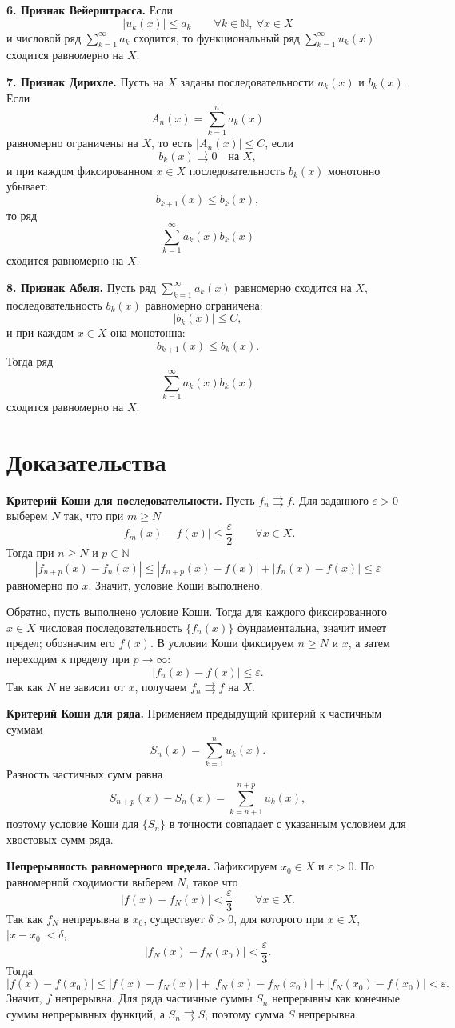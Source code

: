 \documentclass[12pt,a4paper]{article}
\newcommand{\eps}{\varepsilon}
\begin{document}
\textbf{6. Признак Вейерштрасса.}
Если
\[
  |u_k(x)|\le a_k\qquad \forall k\in\mathbb N,\ \forall x\in X
\]
и числовой ряд \(\sum_{k=1}^{\infty}a_k\) сходится, то функциональный ряд
\(\sum_{k=1}^{\infty}u_k(x)\) сходится равномерно на \(X\).

\textbf{7. Признак Дирихле.}
Пусть на \(X\) заданы последовательности \(a_k(x)\) и \(b_k(x)\). Если
\[
  A_n(x)=\sum_{k=1}^n a_k(x)
\]
равномерно ограничены на \(X\), то есть \(|A_n(x)|\le C\), если
\[
  b_k(x)\rightrightarrows 0\quad \text{на }X,
\]
и при каждом фиксированном \(x\in X\) последовательность \(b_k(x)\)
монотонно убывает:
\[
  b_{k+1}(x)\le b_k(x),
\]
то ряд
\[
  \sum_{k=1}^{\infty}a_k(x)b_k(x)
\]
сходится равномерно на \(X\).

\textbf{8. Признак Абеля.}
Пусть ряд \(\sum_{k=1}^{\infty}a_k(x)\) равномерно сходится на \(X\),
последовательность \(b_k(x)\) равномерно ограничена:
\[
  |b_k(x)|\le C,
\]
и при каждом \(x\in X\) она монотонна:
\[
  b_{k+1}(x)\le b_k(x).
\]
Тогда ряд
\[
  \sum_{k=1}^{\infty}a_k(x)b_k(x)
\]
сходится равномерно на \(X\).

\section*{Доказательства}

\textbf{Критерий Коши для последовательности.}
Пусть \(f_n\rightrightarrows f\). Для заданного \(\eps>0\) выберем \(N\) так,
что при \(m\ge N\)
\[
  |f_m(x)-f(x)|\le \frac{\eps}{2}\qquad \forall x\in X.
\]
Тогда при \(n\ge N\) и \(p\in\mathbb N\)
\[
  |f_{n+p}(x)-f_n(x)|
  \le |f_{n+p}(x)-f(x)|+|f_n(x)-f(x)|
  \le \eps
\]
равномерно по \(x\). Значит, условие Коши выполнено.

Обратно, пусть выполнено условие Коши. Тогда для каждого фиксированного
\(x\in X\) числовая последовательность \(\{f_n(x)\}\) фундаментальна, значит
имеет предел; обозначим его \(f(x)\). В условии Коши фиксируем \(n\ge N\) и
\(x\), а затем переходим к пределу при \(p\to\infty\):
\[
  |f_n(x)-f(x)|\le \eps.
\]
Так как \(N\) не зависит от \(x\), получаем \(f_n\rightrightarrows f\) на
\(X\).

\textbf{Критерий Коши для ряда.}
Применяем предыдущий критерий к частичным суммам
\[
  S_n(x)=\sum_{k=1}^n u_k(x).
\]
Разность частичных сумм равна
\[
  S_{n+p}(x)-S_n(x)=\sum_{k=n+1}^{n+p}u_k(x),
\]
поэтому условие Коши для \(\{S_n\}\) в точности совпадает с указанным условием
для хвостовых сумм ряда.

\textbf{Непрерывность равномерного предела.}
Зафиксируем \(x_0\in X\) и \(\eps>0\). По равномерной сходимости выберем
\(N\), такое что
\[
  |f(x)-f_N(x)|<\frac{\eps}{3}\qquad \forall x\in X.
\]
Так как \(f_N\) непрерывна в \(x_0\), существует \(\delta>0\), для которого
при \(x\in X\), \(|x-x_0|<\delta\),
\[
  |f_N(x)-f_N(x_0)|<\frac{\eps}{3}.
\]
Тогда
\[
  |f(x)-f(x_0)|
  \le |f(x)-f_N(x)|+|f_N(x)-f_N(x_0)|+|f_N(x_0)-f(x_0)|
  <\eps.
\]
Значит, \(f\) непрерывна. Для ряда частичные суммы \(S_n\) непрерывны как
конечные суммы непрерывных функций, а \(S_n\rightrightarrows S\); поэтому
сумма \(S\) непрерывна.
\end{document}
